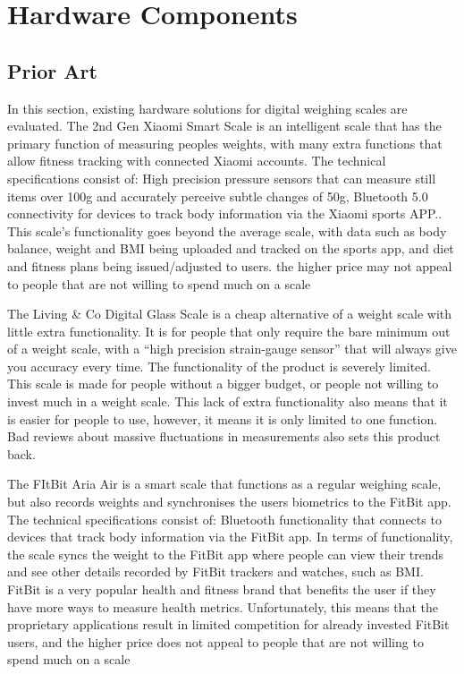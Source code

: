 
\chapter{Hardware Components}

\section{Prior Art}

In this section, existing hardware solutions for digital weighing scales are evaluated. 
The 2nd Gen Xiaomi Smart Scale is an intelligent scale that has the primary function of measuring peoples weights, with many extra functions that allow fitness tracking with connected Xiaomi accounts. The technical specifications consist of: High precision pressure sensors that can measure still items over 100g and accurately perceive subtle changes of 50g, Bluetooth 5.0 connectivity for devices to track body information via the Xiaomi sports APP.. This scale’s functionality goes beyond the average scale, with data such as body balance, weight and BMI being uploaded and tracked on the sports app, and diet and fitness plans being issued/adjusted to users. the higher price may not appeal to people that are not willing to spend much on a scale

The Living \& Co Digital Glass Scale is a cheap alternative of a weight scale with little extra functionality. It is for people that only require the bare minimum out of a weight scale, with a “high precision strain-gauge sensor” that will always give you accuracy every time. The functionality of the product is severely limited. This scale is made for people without a bigger budget, or people not willing to invest much in a weight scale. This lack of extra functionality also means that it is easier for people to use, however, it means it is only limited to one function. Bad reviews about massive fluctuations in measurements also sets this product back.

The FItBit Aria Air is a smart scale that functions as a regular weighing scale, but also records weights and synchronises the users biometrics to the FitBit app. The technical specifications consist of: Bluetooth functionality that connects to devices that track body information via the FitBit app. In terms of functionality, the scale syncs the weight to the FitBit app where people can view their trends and see other details recorded by FitBit trackers and watches, such as BMI. FitBit is a very popular health and fitness brand that benefits the user if they have more ways to measure health metrics. Unfortunately, this means that the proprietary applications result in limited competition for already invested FitBit users, and the higher price does not appeal to people that are not willing to spend much on a scale

